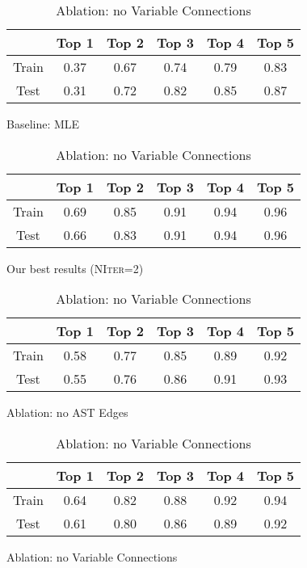 \begin{table}
  \centering
  \begin{subfigure}{\linewidth}
    \centering
    \begin{tabular}{c|ccccc}
      & \textbf{Top 1} & \textbf{Top 2} & \textbf{Top 3} & \textbf{Top 4} & \textbf{Top 5} \\
      \hline
      Train & 0.37 & 0.67 & 0.74 & 0.79 & 0.83 \\
      Test & 0.31 & 0.72 & 0.82 & 0.85 & 0.87
    \end{tabular}
    \caption{Baseline: MLE}\label{tab:results:mle}
  \end{subfigure}

  \medskip

  \begin{subfigure}{\linewidth}
    \centering
    \begin{tabular}{c|ccccc}
      & \textbf{Top 1} & \textbf{Top 2} & \textbf{Top 3} & \textbf{Top 4} & \textbf{Top 5} \\
      \hline
      Train & 0.69 & 0.85 & 0.91 & 0.94 & 0.96 \\
      Test & 0.66 & 0.83 & 0.91 & 0.94 & 0.96
    \end{tabular}
    \caption{Our best results (\textsc{NIter}=2)}\label{tab:results:pure}
  \end{subfigure}

  \medskip

  \begin{subfigure}{\linewidth}
    \centering
    \begin{tabular}{c|ccccc}
      & \textbf{Top 1} & \textbf{Top 2} & \textbf{Top 3} & \textbf{Top 4} & \textbf{Top 5} \\
      \hline
      Train & 0.58 & 0.77 & 0.85 & 0.89 & 0.92 \\
      Test & 0.55 & 0.76 & 0.86 & 0.91 & 0.93
    \end{tabular}
    \caption{Ablation: no AST Edges}\label{tab:results:ast}
  \end{subfigure}

  \medskip

  \begin{subfigure}{\linewidth}
    \centering
    \begin{tabular}{c|ccccc}
      & \textbf{Top 1} & \textbf{Top 2} & \textbf{Top 3} & \textbf{Top 4} & \textbf{Top 5} \\
      \hline
      Train & 0.64 & 0.82 & 0.88 & 0.92 & 0.94 \\
      Test & 0.61 & 0.80 & 0.86 & 0.89 & 0.92
    \end{tabular}
    \caption{Ablation: no Variable Connections}\label{tab:results:variable}
  \end{subfigure}


\end{table}
